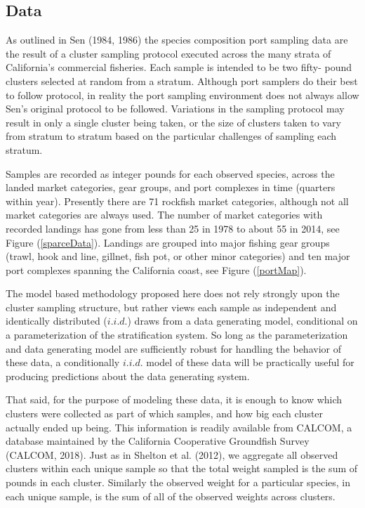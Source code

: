 \documentclass[12pt]{article}
\begin{document}
\subsection{Data}\label{data}

As outlined in Sen (1984, 1986) the species composition port sampling data
are the result of a cluster sampling protocol executed across the many strata 
of California's commercial fisheries.  Each sample is intended to be two fifty-
pound clusters selected at random from a stratum. Although port samplers do 
their best to follow protocol, in reality the port sampling environment does 
not always allow Sen's original protocol to be followed. Variations in the 
sampling protocol may result in only a single cluster being taken, or the size 
of clusters taken to vary from stratum to stratum based on the particular 
challenges of sampling each stratum.

Samples are recorded as integer pounds for each observed species, across the 
landed market categories, gear groups, and port complexes in time (quarters 
within year). Presently there are 71 rockfish market categories, although not 
all market categories are always used. The number of market categories with 
recorded landings has gone from less than 25 in 1978 to about 55 in 2014, see 
Figure (\ref{sparceData}).  Landings are grouped into major fishing gear 
groups (trawl, hook and line, gillnet, fish pot, or other minor categories) 
and ten major port complexes spanning the California coast, see 
Figure (\ref{portMap}).

The model based methodology proposed here does not rely strongly upon
the cluster sampling structure, but rather views each sample as
independent and identically distributed (\(i.i.d.\)) draws from a data
generating model, conditional on a parameterization of the
stratification system. So long as the parameterization and data
generating model are sufficiently robust for handling the behavior of
these data, a conditionally \(i.i.d.\) model of these data will be
practically useful for producing predictions about the data generating
system.

That said, for the purpose of modeling these data, it is enough to know
which clusters were collected as part of which samples, and how big each
cluster actually ended up being. This information is readily available
from CALCOM, a database maintained by the California Cooperative
Groundfish Survey (CALCOM, 2018). Just as in Shelton et al. (2012), we %
aggregate all observed clusters within each unique sample so that the total 
weight sampled is the sum of pounds in each cluster. Similarly the observed 
weight for a particular species, in each unique sample, is the sum of all of 
the observed weights across clusters.
\end{document}
